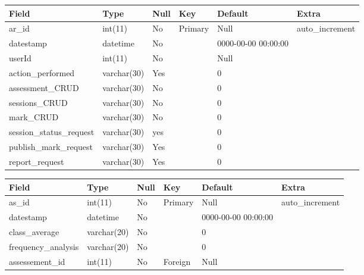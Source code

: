 \documentclass[12pt]{article}
\begin{document}
					
					
					\begin{tabular}{|p{1.1in}|p{0.9in}|p{0.5in}|p{0.4in}|p{1.0in}|p{1.1in}|} \hline
					Field & Type & Null & Key & Default & Extra \\ \hline
					ar\_id & int(11) & No & Primary & Null & auto\_increment \\ \hline
					datestamp & datetime & No &  & 0000-00-00 00:00:00 &  \\ \hline
					userId & int(11) & No &  & Null &  \\ \hline
					action\_performed & varchar(30) & Yes &  & 0 &  \\ \hline
					assessment\_CRUD & varchar(30) & No &  & 0 &  \\ \hline
					sessions\_CRUD & varchar(30) & No &  & 0 &  \\ \hline
					mark\_CRUD & varchar(30) & No &  & 0 &  \\ \hline
					session\_status\_request & varchar(30) & yes &  & 0 &  \\ \hline
					publish\_mark\_request & varchar(30) & Yes &  & 0 &  \\ \hline
					report\_request & varchar(30) & Yes &  & 0 &  \\ \hline
					\end{tabular}
					
					
					\begin{tabular}{|p{1.0in}|p{1.0in}|p{0.4in}|p{0.4in}|p{1.0in}|p{1.1in}|} \hline
					Field & Type & Null & Key & Default & Extra \\ \hline
					as\_id & int(11) & No & Primary & Null & auto\_increment \\ \hline
					datestamp & datetime & No &  & 0000-00-00 00:00:00 &  \\ \hline
					class\_average & varchar(20) & No &  & 0 &  \\ \hline
					frequency\_analysis & varchar(20) & No &  & 0 &  \\ \hline
					assessement\_id & int(11) & No & Foreign & Null &  \\ \hline
					\end{tabular}
				\vspace{0.2in}
			
			
	
	
		
		
	\newpage
\end{document}
